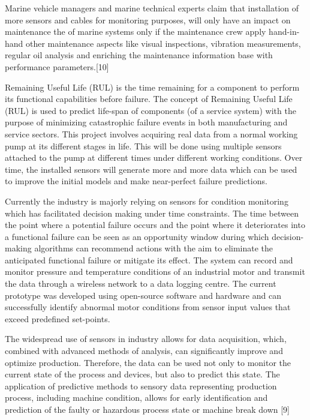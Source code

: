 Marine vehicle managers and marine technical experts claim that installation of more sensors and cables for monitoring purposes, will only have an impact on maintenance the of marine systems only if the maintenance crew apply hand-in-hand other maintenance aspects like visual inspections, vibration measurements, regular oil analysis and enriching the maintenance information base with performance parameters.[10] 

Remaining Useful Life (RUL) is the time remaining for a component to perform its functional capabilities before failure. The concept of Remaining Useful Life (RUL) is used to predict life-span of components (of a service system) with the purpose of minimizing catastrophic failure events in both manufacturing and service sectors. This project involves acquiring real data from a normal working pump at its different stages in life. This will be done using multiple sensors attached to the pump at different times under different working conditions. Over time, the installed sensors will generate more and more data which can be used to improve the initial models and make near-perfect failure predictions. 

Currently the industry is majorly relying on sensors for condition monitoring which has facilitated decision making under time constraints. The time between the point where a potential failure occurs and the point where it deteriorates into a functional failure can be seen as an opportunity window during which decision-making algorithms can recommend actions with the aim to eliminate the anticipated functional failure or mitigate its effect. The system can record and monitor pressure and temperature conditions of an industrial motor and transmit the data through a wireless network to a data logging centre. The current prototype was developed using open-source software and hardware and can successfully identify abnormal motor conditions from sensor input values that exceed predefined set-points. 

The widespread use of sensors in industry allows for data acquisition, which, combined with advanced methods of analysis, can significantly improve and optimize production. Therefore, the data can be used not only to monitor the current state of the process and devices, but also to predict this state. The application of predictive methods to sensory data representing production process, including machine condition, allows for early identification and prediction of the faulty or hazardous process state or machine break down [9] 

